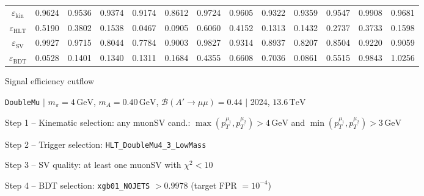 \documentclass[10pt,a4paper]{article}
\begin{document}
\begin{landscape}
{\begin{tabular}{c|cccc|cccc|cccc}
\midrule
$\varepsilon_{\mathrm{kin}}$ & 0.9624 & 0.9536 & 0.9374 & 0.9174 & 0.8612 & 0.9724 & 0.9605 & 0.9322 & 0.9359 & 0.9547 & 0.9908 & 0.9681\\
$\varepsilon_{\mathrm{HLT}}$ & 0.5190 & 0.3802 & 0.1538 & 0.0467 & 0.0905 & 0.6060 & 0.4152 & 0.1313 & 0.1432 & 0.2737 & 0.3733 & 0.1598\\
$\varepsilon_{\mathrm{SV}}$ & 0.9927 & 0.9715 & 0.8044 & 0.7784 & 0.9003 & 0.9827 & 0.9314 & 0.8937 & 0.8207 & 0.8504 & 0.9220 & 0.9059\\
$\varepsilon_{\mathrm{BDT}}$ & 0.0528 & 0.1401 & 0.1340 & 0.1311 & 0.1684 & 0.4355 & 0.6608 & 0.7036 & 0.0861 & 0.5515 & 0.9843 & 1.0256\\
\bottomrule
\end{tabular}}

\end{landscape}
\clearpage

{\large Signal efficiency cutflow

 \texttt{DoubleMu} $|$ $m_{\pi}=4\,\mathrm{GeV}$, $m_{A}=0.40\,\mathrm{GeV}$, $\mathcal{B}(A'\!\to\!\mu\mu)=0.44$ $|$ 2024, $13.6\,\mathrm{TeV}$}

\vspace{0.8em}

Step 1 -- Kinematic selection: any muonSV cand.: $\max(p_T^{\mu_1},p_T^{\mu_2}){>}4\,\mathrm{GeV}$ and $\min(p_T^{\mu_1},p_T^{\mu_2}){>}3\,\mathrm{GeV}$

Step 2 -- Trigger selection: \texttt{HLT\_DoubleMu4\_3\_LowMass}

Step 3 -- SV quality: at least one muonSV with $\chi^2<10$

Step 4 -- BDT selection: \texttt{xgb01\_NOJETS} $>0.9978$ (target FPR $=10^{-4}$)

\vspace{0.8em}
\end{document}

